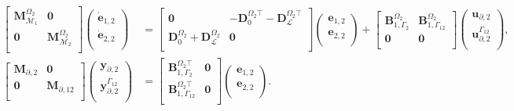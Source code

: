 \begin{equation}\label{eq:pHlinsys_findim_Om2}
\begin{aligned}
\begin{bmatrix}
\mathbf{M}_{\mathcal{M}_1}^{\Omega_2} & \mathbf{0} \\
\mathbf{0} & \mathbf{M}_{\mathcal{M}_2}^{\Omega_2} \\
\end{bmatrix}
\begin{pmatrix}
\dot{\mathbf{e}}_{1, 2} \\
\dot{\mathbf{e}}_{2, 2} \\
\end{pmatrix}
&= \begin{bmatrix}
\mathbf{0} & -\mathbf{D}_{0}^{\Omega_2 \top} - \mathbf{D}_{\mathcal{L}}^{\Omega_2 \top} \\
\mathbf{D}_{0}^{\Omega_2} + \mathbf{D}_{\mathcal{L}}^{\Omega_2} & \mathbf{0} \\
\end{bmatrix} 
\begin{pmatrix}
\mathbf{e}_{1, 2} \\
\mathbf{e}_{2, 2} \\
\end{pmatrix} + 
\begin{bmatrix}
\mathbf{B}_{1, \Gamma_2}^{\Omega_2} & \mathbf{B}_{1, \Gamma_{12}}^{\Omega_2}\\
\mathbf{0} & \mathbf{0}\\
\end{bmatrix}
\begin{pmatrix}
\mathbf{u}_{\partial, 2} \\
\mathbf{u}_{\partial, 2}^{\Gamma_{12}} \\
\end{pmatrix}, \\
\begin{bmatrix}
\mathbf{M}_{\partial, 2} & \mathbf{0}  \\
\mathbf{0} & \mathbf{M}_{\partial, 12} \\
\end{bmatrix}
\begin{pmatrix}
\mathbf{y}_{\partial, 2} \\
\mathbf{y}_{\partial, 2}^{\Gamma_{12}} \\
\end{pmatrix}
&= 
\begin{bmatrix}
\mathbf{B}_{1, \Gamma_2}^{\Omega_2 \top} & \mathbf{0} \\
\mathbf{B}_{1, \Gamma_{12}}^{\Omega_2 \top} & \mathbf{0} \\
\end{bmatrix}\begin{pmatrix}
\mathbf{e}_{1, 2} \\
\mathbf{e}_{2, 2} \\
\end{pmatrix}.
\end{aligned}
\end{equation}

